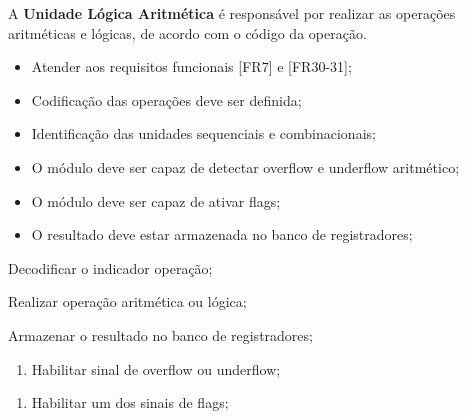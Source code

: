 A \textbf{Unidade Lógica Aritmética} é responsável por realizar as operações aritméticas e lógicas, de acordo com o código da operação.
  
\actors
	\begin{description}
	\end{description}
  
\preconditions 
	\begin{itemize}
	\item Atender aos requisitos funcionais [FR7] e [FR30-31];
	\item Codificação das operações deve ser definida;
	\item Identificação das unidades sequenciais e combinacionais;
	\end{itemize}

\postconditions
    \begin{itemize}
     \item O módulo deve ser capaz de detectar overflow e underflow aritmético;
     \item O módulo deve ser capaz de ativar flags;
     \item O resultado deve estar armazenada no banco de registradores; %
     \end{itemize}
  
%
 
  
\begin{mainflow}
\item Decodificar o indicador operação;
\item Realizar operação aritmética ou lógica;
\item Armazenar o resultado no banco de registradores;
\end{mainflow}
  
\begin{secondaryflow} 
\begin{enumerate}
\item Habilitar sinal de overflow ou underflow;
\end{enumerate}
\begin{enumerate}
\item Habilitar um dos sinais de flags;
\end{enumerate}
\end{secondaryflow} 
